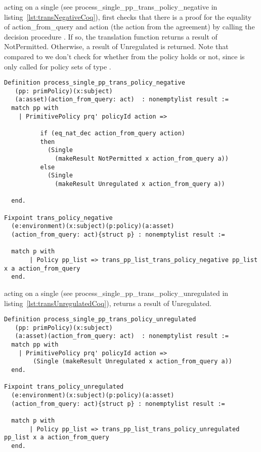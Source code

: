  acting on a single  (see process_single_pp_trans_policy_negative in listing~\ref{lst:transNegativeCoq}), first checks that there is a proof for the equality of action_from_query and action (the action from the agreement) by calling the decision procedure . If so, the translation function returns a result of NotPermitted. Otherwise, a result of Unregulated is returned. Note that compared to  we don't check for whether  from the policy holds or not, since  is only called for policy sets of type .


\begin{lstlisting}
Definition process_single_pp_trans_policy_negative
   (pp: primPolicy)(x:subject)
   (a:asset)(action_from_query: act)  : nonemptylist result :=
  match pp with
    | PrimitivePolicy prq' policyId action =>
 
          if (eq_nat_dec action_from_query action)
          then
            (Single 
              (makeResult NotPermitted x action_from_query a))
          else
            (Single 
              (makeResult Unregulated x action_from_query a))

  end.

Fixpoint trans_policy_negative
  (e:environment)(x:subject)(p:policy)(a:asset)
  (action_from_query: act){struct p} : nonemptylist result :=
  
  match p with  
       | Policy pp_list => trans_pp_list_trans_policy_negative pp_list x a action_from_query
  end.
\end{lstlisting}


 acting on a single  (see process_single_pp_trans_policy_unregulated in listing~\ref{lst:transUnregulatedCoq}), returns a result of Unregulated.

\begin{lstlisting}
Definition process_single_pp_trans_policy_unregulated
   (pp: primPolicy)(x:subject)
   (a:asset)(action_from_query: act)  : nonemptylist result :=
  match pp with
    | PrimitivePolicy prq' policyId action =>
        (Single (makeResult Unregulated x action_from_query a))
  end.

Fixpoint trans_policy_unregulated
  (e:environment)(x:subject)(p:policy)(a:asset)
  (action_from_query: act){struct p} : nonemptylist result :=

  match p with
       | Policy pp_list => trans_pp_list_trans_policy_unregulated pp_list x a action_from_query
  end.

\end{lstlisting}



